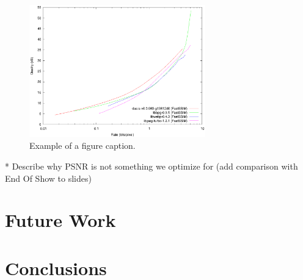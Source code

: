 \documentclass[conference, 10pt]{IEEEtran}
\begin{document}
\begin{figure}[h]
\begin{center}
\noindent
  \includegraphics[width=3in]{pcs2015-fastssim}
  \caption{Example of a figure caption.}\label{Fig1Label}
\end{center}
\end{figure}

* Describe why PSNR is not something we optimize for (add comparison with End Of Show to slides)



\section{Future Work}

\section{Conclusions}
\end{document}
